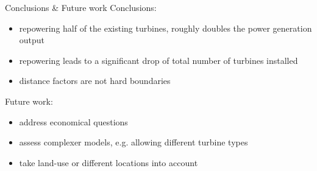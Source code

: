 \documentclass[color=usenames,dvipsnames]{beamer}
\begin{document}
    \begin{frame}{Conclusions \& Future work}
        Conclusions:\\
        \begin{itemize}
            \item repowering half of the existing turbines, roughly doubles the
                power generation output\pause
            \item repowering leads to a significant drop of total number of
                turbines installed\pause
            \item distance factors are not hard boundaries\pause
        \end{itemize}

        \bigskip

        Future work:\\
        \begin{itemize}
            \item address economical questions\pause
            \item assess complexer models, e.g. allowing different turbine types\pause
            \item take land-use or different locations into account
        \end{itemize}
    \end{frame}
\end{document}
